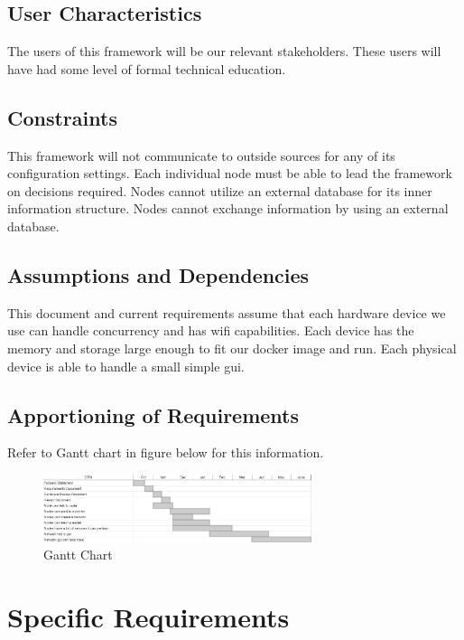 \documentclass[draftclsnofoot, onecolumn, compsoc, 10pt]{IEEEtran}
\begin{document}
\subsection{User Characteristics} 
The users of this framework will be our relevant stakeholders. These users will have had some level of formal technical education.

\subsection{Constraints}
This framework will not communicate to outside sources for any of its configuration settings. Each individual node must be able to lead the framework on decisions required. Nodes cannot utilize an external database for its inner information structure. Nodes cannot exchange information by using an external database.

\subsection{Assumptions and Dependencies}
This document and current requirements assume that each hardware device we use can handle concurrency and has wifi capabilities. Each device has the memory and storage large enough to fit our docker image and run. Each physical device is able to handle a small simple gui.

\subsection{Apportioning of Requirements}
Refer to Gantt chart in figure below for this information.
\begin{figure}[!htb]
  \caption{Gantt Chart}
  \centering
    \includegraphics[width=0.7\textwidth]{chart}
\end{figure}
\FloatBarrier

\section{Specific Requirements}
\end{document}
